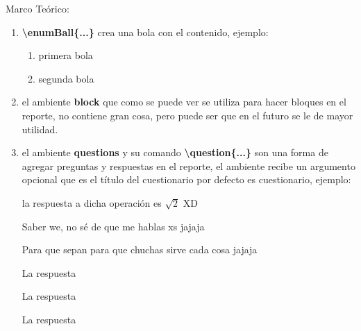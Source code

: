 \documentclass[11pt, letterpaper]{article}
\begin{document}
\begin{block}{Marco Teórico:\\}
\begin{enumerate}
			\item \textbf{\textbackslash enumBall\{...\}} crea una bola con el contenido, ejemplo:
			
			\renewcommand{\textballcolor}{white}
			
			
			\renewcommand{\ballcolor}{green}
			
			\begin{enumerate}[label=\enumBall{\arabic*}]
				\item primera bola
				\item segunda bola
			\end{enumerate}
		
			
			\item el ambiente \textbf{block} que como se puede ver se utiliza para hacer bloques en el reporte, no contiene gran cosa, pero puede ser que en el futuro se le de mayor utilidad.
			
			\item el ambiente \textbf{questions} y su comando \textbf{\textbackslash question\{...\}} son una forma de agregar preguntas y respuestas en el reporte, el ambiente recibe un argumento opcional que es el título del cuestionario por defecto es cuestionario, ejemplo:
			
			\begin{questions}[Preguntas Tontas]
				
				 la respuesta a dicha operación es $\sqrt{2}$ XD
				
				 Saber we, no sé de que me hablas xs jajaja

				 Para que sepan para que chuchas sirve cada cosa jajaja
			\end{questions}	
			 \newpage %
			\begin{questions}
				
				 La respuesta
				
				 La respuesta
				
				 La respuesta
				
			\end{questions}
		\end{enumerate}
		
	\end{block}
\end{document}
